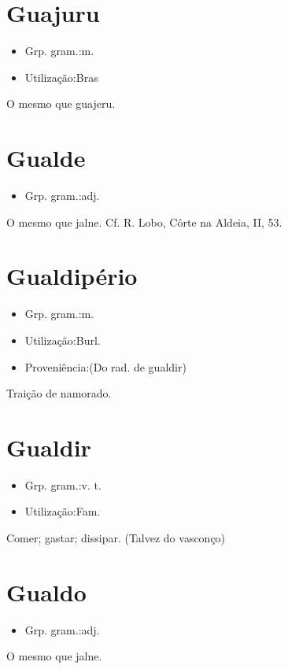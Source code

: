 \section{Guajuru}
\begin{itemize}
\item {Grp. gram.:m.}
\end{itemize}
\begin{itemize}
\item {Utilização:Bras}
\end{itemize}
O mesmo que \textunderscore guajeru\textunderscore .
\section{Gualde}
\begin{itemize}
\item {Grp. gram.:adj.}
\end{itemize}
O mesmo que \textunderscore jalne\textunderscore . Cf. R. Lobo, \textunderscore Côrte na Aldeia\textunderscore , II, 53.
\section{Gualdipério}
\begin{itemize}
\item {Grp. gram.:m.}
\end{itemize}
\begin{itemize}
\item {Utilização:Burl.}
\end{itemize}
\begin{itemize}
\item {Proveniência:(Do rad. de \textunderscore gualdir\textunderscore )}
\end{itemize}
Traição de namorado.
\section{Gualdir}
\begin{itemize}
\item {Grp. gram.:v. t.}
\end{itemize}
\begin{itemize}
\item {Utilização:Fam.}
\end{itemize}
Comer; gastar; dissipar.
(Talvez do vasconço)
\section{Gualdo}
\begin{itemize}
\item {Grp. gram.:adj.}
\end{itemize}
O mesmo que \textunderscore jalne\textunderscore .
